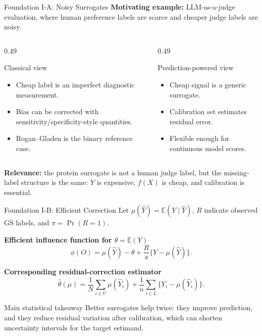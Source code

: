 \documentclass[aspectratio=169,10pt]{beamer}
\newcommand{\E}{\mathbb{E}}
\begin{document}
\begin{frame}{Foundation I-A: Noisy Surrogates}
\textbf{Motivating example:} LLM-as-a-judge evaluation, where human preference labels are scarce and cheaper judge labels are noisy.

\vspace{0.15cm}
\begin{columns}[T,totalwidth=\textwidth]
\begin{column}{0.49\textwidth}
\begin{block}{Classical view}
\begin{itemize}
  \item Cheap label is an imperfect diagnostic measurement.
  \item Bias can be corrected with sensitivity/specificity-style quantities.
  \item Rogan--Gladen is the binary reference case.
\end{itemize}
\end{block}
\end{column}
\begin{column}{0.49\textwidth}
\begin{block}{Prediction-powered view}
\begin{itemize}
  \item Cheap signal is a generic surrogate.
  \item Calibration set estimates residual error.
  \item Flexible enough for continuous model scores.
\end{itemize}
\end{block}
\end{column}
\end{columns}

\vspace*{0.2cm}
\textbf{Relevance:} the protein surrogate is not a human judge label, but the missing-label structure is the same: \(Y\) is expensive, \(f(X)\) is cheap, and calibration is essential.
\end{frame}

\begin{frame}{Foundation I-B: Efficient Correction}
Let \(\mu(\widehat Y)=\E(Y\mid \widehat Y)\), \(R\) indicate observed GS labels, and \(\pi=\Pr(R=1)\).

\textbf{Efficient influence function for \(\theta=\E(Y)\)}
\[
\phi(O)
=
\mu(\widehat{Y})-\theta
+
\frac{R}{\pi}\{Y-\mu(\widehat{Y})\}.
\]

\textbf{Corresponding residual-correction estimator}
\[
\widehat{\theta}(\mu)
=
\frac{1}{N}\sum_{i\in U}\mu(\widehat{Y}_i)
+
\frac{1}{n}\sum_{i\in L}\{Y_i-\mu(\widehat{Y}_i)\}.
\]

\begin{block}{Main statistical takeaway}
Better surrogates help twice: they improve prediction, and they reduce residual variation after calibration, which can shorten uncertainty intervals for the target estimand.
\end{block}
\end{frame}
\end{document}
